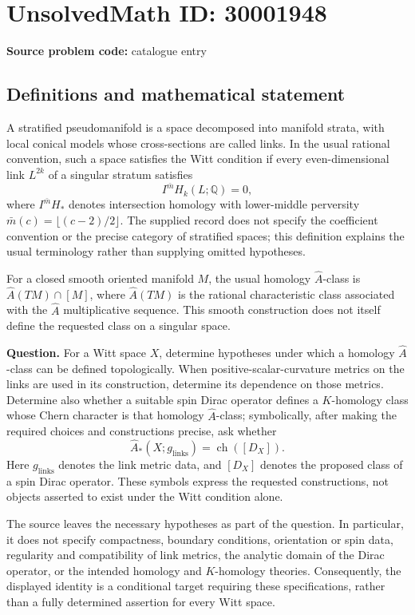\documentclass[11pt]{article}
\newcommand{\Q}{\mathbb{Q}}
\begin{document}
\section*{UnsolvedMath ID: 30001948}
\textbf{Source problem code:} catalogue entry
\subsection{Definitions and mathematical statement}
A stratified pseudomanifold is a space decomposed into manifold strata, with local conical models whose cross-sections are called links. In the usual rational convention, such a space satisfies the Witt condition if every even-dimensional link \(L^{2k}\) of a singular stratum satisfies
\[
I^{\bar m}H_k(L;\Q)=0,
\]
where \(I^{\bar m}H_*\) denotes intersection homology with lower-middle perversity \(\bar m(c)=\lfloor(c-2)/2\rfloor\). The supplied record does not specify the coefficient convention or the precise category of stratified spaces; this definition explains the usual terminology rather than supplying omitted hypotheses.

For a closed smooth oriented manifold \(M\), the usual homology \(\widehat A\)-class is \(\widehat A(TM)\cap[M]\), where \(\widehat A(TM)\) is the rational characteristic class associated with the \(\widehat A\) multiplicative sequence. This smooth construction does not itself define the requested class on a singular space.

\textbf{Question.} For a Witt space \(X\), determine hypotheses under which a homology \(\widehat A\)-class can be defined topologically. When positive-scalar-curvature metrics on the links are used in its construction, determine its dependence on those metrics. Determine also whether a suitable spin Dirac operator defines a \(K\)-homology class whose Chern character is that homology \(\widehat A\)-class; symbolically, after making the required choices and constructions precise, ask whether
\[
\widehat A_*(X;g_{\mathrm{links}})
=\operatorname{ch}([D_X]).
\]
Here \(g_{\mathrm{links}}\) denotes the link metric data, and \([D_X]\) denotes the proposed class of a spin Dirac operator. These symbols express the requested constructions, not objects asserted to exist under the Witt condition alone.

The source leaves the necessary hypotheses as part of the question. In particular, it does not specify compactness, boundary conditions, orientation or spin data, regularity and compatibility of link metrics, the analytic domain of the Dirac operator, or the intended homology and \(K\)-homology theories. Consequently, the displayed identity is a conditional target requiring these specifications, rather than a fully determined assertion for every Witt space.
\end{document}
